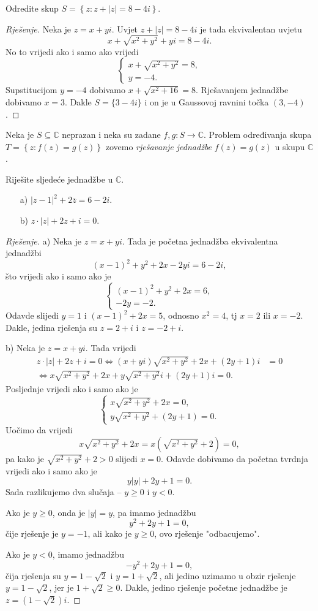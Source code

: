 \begin{exercise}
Odredite skup $S=\left\{z : z+|z|=8-4i\right\}$.
\end{exercise}
\begin{proof}[Rješenje]
Neka je $z=x+yi$. Uvjet $z+|z|=8-4i$ je tada ekvivalentan uvjetu
$$x+\sqrt{x^2+y^2}+yi=8-4i.$$ No to vrijedi ako i samo ako vrijedi
$$\begin{cases}
x+\sqrt{x^2+y^2}=8,\\
y=-4.
\end{cases}$$
Supstitucijom $y=-4$ dobivamo $x+\sqrt{x^2+16}=8$. Rješavanjem jednadžbe dobivamo $x=3$. Dakle $S=\{3-4i\}$ i on je u Gaussovoj ravnini točka $(3, -4)$.
\end{proof}
Neka je $S\subseteq \mathbb{C}$ neprazan i neka su zadane $f, g : S\to \mathbb{C}$. Problem određivanja skupa $T=\left\{z : f(z)=g(z)\right\}$ zovemo \textit{rješavanje jednadžbe} $f(z)=g(z)$ u skupu $\mathbb{C}$.
\begin{exercise} Riješite sljedeće jednadžbe u $\mathbb{C}$.
\begin{itemize}
\item[a)] $|z-1|^2+2\overline{z}=6-2i$.
\item[b)] $z\cdot |z|+2z+i=0.$
\end{itemize}
\end{exercise}
\begin{proof}[Rješenje]
a) Neka je $z=x+yi$. Tada je početna jednadžba ekvivalentna jednadžbi $$(x-1)^2+y^2+2x-2yi=6-2i,$$
što vrijedi ako i samo ako je
$$\begin{cases}
(x-1)^2+y^2+2x=6,\\
-2y=-2.
\end{cases}$$
Odavde slijedi $y=1$ i $(x-1)^2+2x=5$, odnosno $x^2=4$, tj $x=2$ ili $x=-2$. Dakle, jedina rješenja su $z=2+i$ i $z=-2+i$.

b) Neka je $z=x+yi$. Tada vrijedi
\begin{align*}
z\cdot |z|+2z+i=0\Leftrightarrow (x+yi)\sqrt{x^2+y^2}+2x+(2y+1)i&=0\\
\Leftrightarrow x\sqrt{x^2+y^2}+2x+y\sqrt{x^2+y^2}i+(2y+1)i=0.
\end{align*}
Posljednje vrijedi ako i samo ako je
$$\begin{cases}
x\sqrt{x^2+y^2}+2x=0,\\
y\sqrt{x^2+y^2}+(2y+1)=0.
\end{cases}$$
Uočimo da vrijedi $$x\sqrt{x^2+y^2}+2x=x(\sqrt{x^2+y^2}+2)=0,$$ pa kako je $\sqrt{x^2+y^2}+2>0$ slijedi $x=0$. Odavde dobivamo da početna tvrdnja vrijedi ako i samo ako je 
$$y|y|+2y+1=0.$$ Sada razlikujemo dva slučaja -- $y\geq 0$ i $y<0$.

Ako je $y\geq 0$, onda je $|y|=y$, pa imamo jednadžbu $$y^2+2y+1=0,$$ čije rješenje je $y=-1$, ali kako je $y\geq 0$, ovo rješenje "odbacujemo". 

Ako je $y<0$, imamo jednadžbu $$-y^2+2y+1=0,$$ čija rješenja su $y=1-\sqrt{2}$ i $y=1+\sqrt{2}$, ali jedino uzimamo u obzir rješenje $y=1-\sqrt{2}$, jer je $1+\sqrt{2}\geq 0$. Dakle, jedino rješenje početne jednadžbe je $z=(1-\sqrt{2})i$.
\end{proof}
